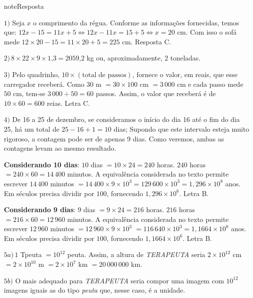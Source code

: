 \begin{sphinxadmonition}{note}{Resposta}

\(1)\) Seja \(x\) o comprimento da régua. Conforme as informações fornecidas, temos que:
\(12x - 15 = 11x + 5 \Leftrightarrow 12x - 11x = 15 + 5 \Leftrightarrow x = 20\) cm.
Com isso o sofá mede \(12 \times 20 - 15 = 11 \times 20 + 5 = 225\) cm.
Resposta C.

\(2) \, 8 \times 22 \times 9 \times 1\text{,}3 = 2059\text{,}2\) kg ou, aproximadamente, 2 toneladas.

\(3)\) Pelo quadrinho, \(10 \times (\text{total de passos})\), fornece o valor, em reais, que esse carregador receberá.
Como \(30\) m \(= 30 \times 100\) cm \(=3\, 000\) cm e cada passo mede \(50\) cm, tem-se \(3\, 000 \div 50 = 60\) passos. Assim, o valor que receberá é de \(10\times 60 = 600\) reias. Letra C.

\(4)\) De 16 a 25 de dezembro, se consideramos o início do dia 16 até o fim do dia 25, há um total de \(25 - 16 + 1 = 10\) dias; Supondo que este intervalo esteja muito rigoroso, a contagem pode ser de apenas 9 dias. Como veremos, ambas as contagens levam ao mesmo resultado.

\textbf{Considerando 10 dias}: \(10\) dias \(= 10\times 24=240\) horas. \(240\) horas \(= 240 \times 60 = 14\,400\) minutos. A equivalência considerada no texto permite escrever \(14\,400\) minutos \(= 14\,400 \times 9 \times 10^3 =129\,600 \times 10^3 = 1,296 \times 10^8\) anos. Em séculos precisa dividir por \(100\), fornecendo \(1,296 \times 10^6\). Letra B.

\textbf{Considerando 9 dias}: \(9\) dias \(= 9\times 24 = 216\) horas. \(216\) horas \(=216\times 60 = 12\,960\) minutos. A equivalência considerada no texto permite escrever \(12\,960\) minutos \(= 12\,960 \times 9 \times 10^3\) \(=116\,640 \times 10^3 = 1,1664 \times 10^8\) anos. Em séculos precisa dividir por \(100\), fornecendo \(1,1664 \times 10^6\). Letra B.

\(5a)\, 1\) Tpeuta \(= 10^{12}\) peuta. Assim, a altura de \textit{TERAPEUTA} seria \(2 \times 10^{12}\) cm \(= 2 \times 10^{10}\) m \(= 2 \times 10^7\) km \(= 20\,000\,000\) km.

\(5b)\) O mais adequado para \textit{TERAPEUTA} seria compor uma imagem com \(10^{12}\) imagens iguais as do tipo \textit{peuta} que, nesse caso, é a unidade.
\end{sphinxadmonition}



